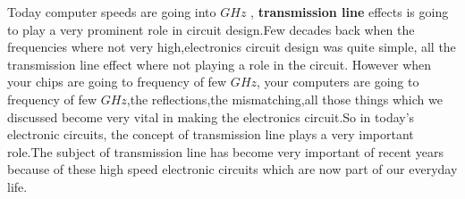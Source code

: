 Today computer speeds are going into $GHz$ , \textbf{transmission line} effects is going to play a very prominent role in circuit design.Few decades back when the frequencies where not very high,electronics circuit design was quite simple, all the transmission line effect where not playing a role in the circuit. However when your chips are going to frequency of few $GHz$, your computers are going to frequency of few $GHz$,the reflections,the mismatching,all those things which we discussed become very vital in making the electronics circuit.So in today's electronic circuits, the concept of transmission line plays a very  important role.The subject of transmission line has become very important of recent years because of these high speed electronic circuits which are now part of our everyday life. 